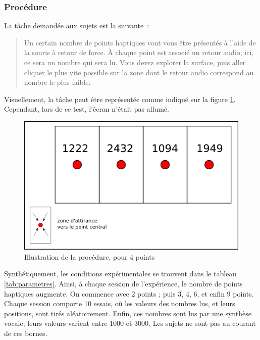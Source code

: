 \documentclass[
]{book}
\begin{document}
\hypertarget{procuxe9dure-2}{%
\subsubsection{Procédure}\label{procuxe9dure-2}}

La tâche demandée aux sujets est la suivante~:

\begin{quote}
Un certain nombre de points haptiques vont vous être présentés à l'aide de
la souris à retour de force. À chaque point est associé un retour audio;
ici, ce sera un nombre qui sera lu. Vous devez explorer la surface, puis
aller cliquer le plus vite possible sur la zone dont le retour audio
correspond au nombre le plus faible.
\end{quote}

Visuellement, la tâche peut être représentée comme indiqué sur la
figure \ref{fig:procedure4}. Cependant, lors de ce
test, l'écran n'était pas allumé.

\begin{figure}
\centering
\includegraphics{img/zone.png}
\caption{\label{fig:procedure4}Illustration de la procédure, pour 4 points}
\end{figure}

Synthétiquement, les conditions expérimentales se trouvent dans le
tableau \ref{tab:parametres}. Ainsi, à
chaque session de l'expérience, le nombre de points haptiques augmente. On
commence avec 2 points ; puis 3, 4, 6, et enfin 9 points. Chaque session
comporte 10 essais, où les valeurs des nombres lus, et leurs positions, sont
tirés aléatoirement. Enfin, ces nombres sont lus par une synthèse vocale;
leurs valeurs varient entre 1000 et 3000. Les sujets ne sont pas au courant
de ces bornes.
\end{document}
